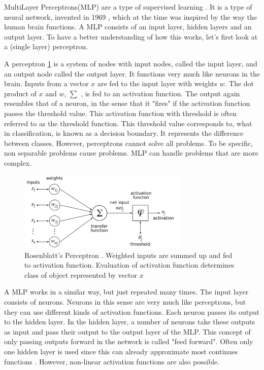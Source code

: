 MultiLayer Perceptrons(MLP) are a type of supervised learning \cite{michie1994machine}. It is a type of neural network, invented in 1969 \cite{minsky1969perceptions}, which at the time  was inspired by the way the human brain functions. A MLP consists of an input layer, hidden layers and an output layer. To have a better understanding of how this works, let's first look at a (single layer) perceptron\cite{rosenblatt1958perceptron}. 

A perceptron \ref{fig:perceptron} is a system of nodes with input nodes, called the input layer, and an output node called the output layer. It functions very much like neurons in the brain. Inputs from a vector $x$ are fed to the input layer with weights $w$. The dot product of $x$ and $w$, $\sum$ ,  is fed to an activation function. The output again resembles that of a neuron, in the sense that it "fires" if the activation function passes the threshold value. This activation function with threshold is often referred to as the threshold function. This threshold value corresponds to, what in classification, is known as a decision boundary. It represents the difference between classes. However, perceptrons cannot solve all problems. To be specific, non separable problems cause problems. MLP can handle problems that are more complex. \\
\begin{figure}[H]
    \includegraphics[width=80mm]{./img/perceptron.png}
    \caption{\footnotesize{Rosenblatt's Perceptron \cite{wikiPerceptronPNG}. Weighted inputs are summed up and fed to activation function. Evaluation of activation function determines class of object represented by vector $x$}}
    \label{fig:perceptron}
\end{figure}

A MLP works in a similar way, but just repeated many times. The input layer consists of neurons. Neurons in this sense are very much like perceptrons, but they can use different kinds of activation functions. Each neuron passes its output to the hidden layer. In the hidden layer, a number of neurons take these outputs as input and pass their output to the output layer of the MLP. This concept of only passing outputs forward in the network is called "feed forward". Often only one hidden layer is used since this can already approximate most continues functions \cite{cybenko1989approximation}. However, non-linear activation functions are also possible. 

